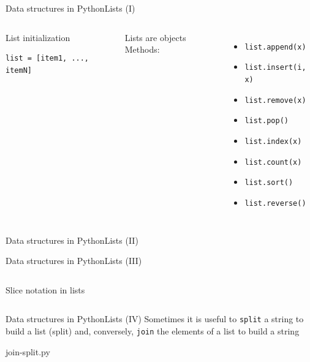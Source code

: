 \documentclass[10pt,compress]{beamer} %
\begin{document}
\begin{frame}[fragile]{Data structures in Python}{Lists (I)}
    \begin{columns}
	   \begin{block}{List initialization}
	   	\begin{verbatim}
list = [item1, ..., itemN]
\end{verbatim}
	   \end{block}
	   Lists are objects
	Methods:
	\begin{itemize}
		\item \texttt{list.append(x)}
		\item \texttt{list.insert(i, x)}
		\item \texttt{list.remove(x)}
		\item \texttt{list.pop()}
		\item \texttt{list.index(x)}
		\item \texttt{list.count(x)}
		\item \texttt{list.sort()}
		\item \texttt{list.reverse()}
	\end{itemize}
   \end{columns}
\end{frame}

\begin{frame}[fragile]{Data structures in Python}{Lists (II)}
		\begin{exampleblock}{}
		\vspace{-0.4cm}
		
		\vspace{-0.2cm}
		\end{exampleblock}
\end{frame}

\begin{frame}[fragile]{Data structures in Python}{Lists (III)}
    \begin{columns}
 	   \column{.50\textwidth}
		\begin{exampleblock}{Slice notation in lists}
		\vspace{-0.4cm}
		
		\vspace{-0.2cm}
		\end{exampleblock}
   \end{columns}
\end{frame}

\begin{frame}[fragile]{Data structures in Python}{Lists (IV)}
Sometimes it is useful to \texttt{split} a string to build a list (split) and, conversely, \texttt{join} the elements of a list to build a string
\scriptsize{
		\begin{exampleblock}{join-split.py}
		
		\end{exampleblock}
		}
\end{frame}
\end{document}
